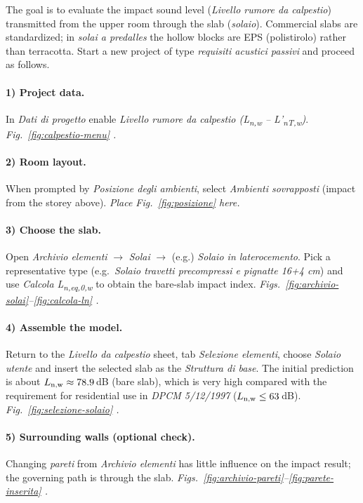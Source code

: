 The goal is to evaluate the impact sound level (\textit{Livello rumore da calpestio}) transmitted from the upper room through the slab (\textit{solaio}). Commercial slabs are standardized; in \textit{solai a predalles} the hollow blocks are EPS (polistirolo) rather than terracotta.  
Start a new project of type \textit{requisiti acustici passivi} and proceed as follows.

\paragraph{1) Project data.}
In \textit{Dati di progetto} enable \textit{Livello rumore da calpestio (L\textsubscript{n,w} -- L'\textsubscript{nT,w})}.  
\emph{ Fig.~\ref{fig:calpestio-menu} .}

\paragraph{2) Room layout.}
When prompted by \textit{Posizione degli ambienti}, select \textit{Ambienti sovrapposti} (impact from the storey above).  
\emph{Place Fig.~\ref{fig:posizione} here.}

\paragraph{3) Choose the slab.}
Open \textit{Archivio elementi} $\rightarrow$ \textit{Solai} $\rightarrow$ (e.g.) \textit{Solaio in laterocemento}. Pick a representative type (e.g.\ \textit{Solaio travetti precompressi e pignatte 16+4 cm}) and use \textit{Calcola L\textsubscript{n,eq,0,w}} to obtain the bare-slab impact index.  
\emph{ Figs.~\ref{fig:archivio-solai}--\ref{fig:calcola-ln} .}

\paragraph{4) Assemble the model.}
Return to the \textit{Livello da calpestio} sheet, tab \textit{Selezione elementi}, choose \textit{Solaio utente} and insert the selected slab as the \textit{Struttura di base}. The initial prediction is about $L\textsubscript{n,w}\approx78.9$\,dB (bare slab), which is very high compared with the requirement for residential use in \textit{DPCM 5/12/1997} ($L\textsubscript{n,w}\le 63$\,dB).  
\emph{ Fig.~\ref{fig:selezione-solaio} .}

\paragraph{5) Surrounding walls (optional check).}
Changing \textit{pareti} from \textit{Archivio elementi} has little influence on the impact result; the governing path is through the slab.  
\emph{ Figs.~\ref{fig:archivio-pareti}--\ref{fig:parete-inserita} .}

